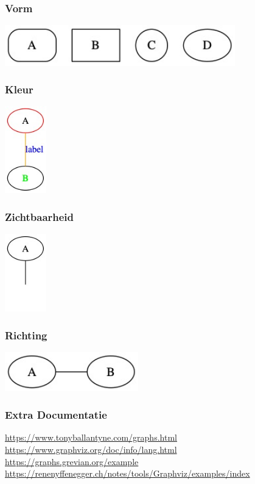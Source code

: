 \begin{frame}
	\frametitle{Vorm}
    \lstIII
    \includegraphics[align=c, width=10cm]{res/basic3}
\end{frame}

\begin{frame}
	\frametitle{Kleur}
    \lstIIII
    \includegraphics[align=c, width=1.8cm]{res/basic4}
\end{frame}

\begin{frame}
	\frametitle{Zichtbaarheid}
    \lstV
    \includegraphics[align=c, width=1.8cm]{res/basic5}
\end{frame}

\begin{frame}
	\frametitle{Richting}
    \lstVI
    \includegraphics[align=c, width=5.8cm]{res/basic6}
\end{frame}

\begin{frame}
	\frametitle{Extra Documentatie}
    \url{https://www.tonyballantyne.com/graphs.html}
    \url{https://www.graphviz.org/doc/info/lang.html}
    \url{https://graphs.grevian.org/example}
    \url{https://renenyffenegger.ch/notes/tools/Graphviz/examples/index}
\end{frame}

